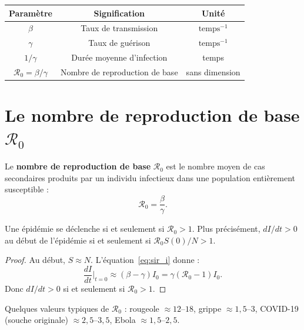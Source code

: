 \begin{formules}[title=\textbf{Param\`etres du mod\`ele SIR}]
\begin{center}
\begin{tabular}{ccc}
\toprule
Param\`etre & Signification & Unit\'e \\
\midrule
$\beta$ & Taux de transmission & $\text{temps}^{-1}$ \\
$\gamma$ & Taux de gu\'erison & $\text{temps}^{-1}$ \\
$1/\gamma$ & Dur\'ee moyenne d'infection & temps \\
$\mathcal{R}_0 = \beta/\gamma$ & Nombre de reproduction de base & sans dimension \\
\bottomrule
\end{tabular}
\end{center}
\end{formules}

\section{Le nombre de reproduction de base $\mathcal{R}_0$}
\label{sec:r0}

\begin{definition}
Le \textbf{nombre de reproduction de base} $\mathcal{R}_0$ est le
nombre moyen de cas secondaires produits par un individu infectieux
dans une population enti\`erement susceptible :
\[
  \mathcal{R}_0 = \frac{\beta}{\gamma}.
\]
\end{definition}

\begin{theoreme}
Une \'epid\'emie se d\'eclenche si et seulement si $\mathcal{R}_0 > 1$.
Plus pr\'ecis\'ement, $dI/dt > 0$ au d\'ebut de l'\'epid\'emie si et
seulement si $\mathcal{R}_0 S(0)/N > 1$.
\end{theoreme}

\begin{proof}
Au d\'ebut, $S\approx N$. L'\'equation~\eqref{eq:sir_i} donne :
\[
  \frac{dI}{dt}\bigg|_{t=0} \approx (\beta - \gamma)I_0
  = \gamma(\mathcal{R}_0 - 1)I_0.
\]
Donc $dI/dt > 0$ si et seulement si $\mathcal{R}_0 > 1$.
\end{proof}

\begin{remarque}
Quelques valeurs typiques de $\mathcal{R}_0$ :
rougeole $\approx 12$--$18$, grippe $\approx 1{,}5$--$3$,
COVID-19 (souche originale) $\approx 2{,}5$--$3{,}5$,
Ebola $\approx 1{,}5$--$2{,}5$.
\end{remarque}

